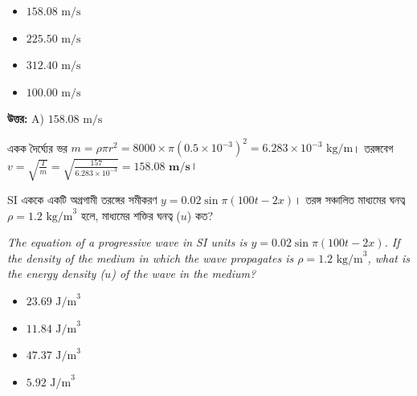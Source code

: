 \documentclass[12pt, a4paper]{article}
\begin{document}
\begin{itemize}[label={}, leftmargin=1cm, itemsep=0.5em]
    \item[\textbf{A)}] $158.08\text{ m/s}$
    \item[\textbf{B)}] $225.50\text{ m/s}$
    \item[\textbf{C)}] $312.40\text{ m/s}$
    \item[\textbf{D)}] $100.00\text{ m/s}$
\end{itemize}

\vspace{0.5em}
\begin{tcolorbox}[answerbox]
    \textbf{\color{success} উত্তর:} A) $158.08\text{ m/s}$
\end{tcolorbox}
\vspace{1em}

\begin{tcolorbox}[solutionbox={সমাধান (Solution)}]
    \noindent
    একক দৈর্ঘ্যের ভর $m = \rho \pi r^2 = 8000 \times \pi (0.5 \times 10^{-3})^2 = 6.283 \times 10^{-3}\text{ kg/m}$। তরঙ্গবেগ $v = \sqrt{\frac{T}{m}} = \sqrt{\frac{157}{6.283 \times 10^{-3}}} = \mathbf{158.08\text{ m/s}}$।
\end{tcolorbox}

\vspace{2em}

\begin{tcolorbox}[questionbox={প্রশ্ন (Question) 15}]
    \noindent
    SI এককে একটি অগ্রগামী তরঙ্গের সমীকরণ $y = 0.02 \sin \pi (100t - 2x)$। তরঙ্গ সঞ্চালিত মাধ্যমের ঘনত্ব $\rho = 1.2\text{ kg/m}^3$ হলে, মাধ্যমের শক্তির ঘনত্ব ($u$) কত?
    
    \vspace{0.8em}
    \begin{english}
    \noindent\textit{\color{darkgray}
    The equation of a progressive wave in SI units is $y = 0.02 \sin \pi (100t - 2x)$. If the density of the medium in which the wave propagates is $\rho = 1.2\text{ kg/m}^3$, what is the energy density ($u$) of the wave in the medium?
    }
    \end{english}
\end{tcolorbox}

\begin{itemize}[label={}, leftmargin=1cm, itemsep=0.5em]
    \item[\textbf{A)}] $23.69\text{ J/m}^3$
    \item[\textbf{B)}] $11.84\text{ J/m}^3$
    \item[\textbf{C)}] $47.37\text{ J/m}^3$
    \item[\textbf{D)}] $5.92\text{ J/m}^3$
\end{itemize}
\end{document}

